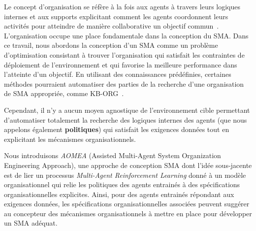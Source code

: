 Le concept d'organisation se réfère à la fois aux agents à travers leurs logiques internes et aux supports explicitant comment les agents coordonnent leurs activités pour atteindre de manière collaborative un objectif commun~\cite{Picard2009reorganisation}. L'organisation occupe une place fondamentale dans la conception du SMA.
%
%
%
%
%
Dans ce travail, nous abordons la conception d'un SMA comme un problème d'optimisation consistant à trouver l'organisation qui satisfait les contraintes de déploiement de l'environnement et qui favorise la meilleure performance dans l'atteinte d'un objectif.
En utilisant des connaissances prédéfinies, certaines méthodes pourraient automatiser des parties de la recherche d'une organisation de SMA appropriée, comme KB-ORG~\cite{Sims2008}.

Cependant, il n'y a aucun moyen agnostique de l'environnement cible permettant d'automatiser totalement la recherche des logiques internes des agents (que nous appelons également \textbf{politiques}) qui satisfait les exigences données tout en explicitant les mécanismes organisationnels. %

Nous introduisons \emph{AOMEA} (Assisted Multi-Agent System Organization Engineering Approach), une approche de conception SMA dont l'idée sous-jacente est de lier un processus \emph{Multi-Agent Reinforcement Learning} donné à un modèle organisationnel qui relie les politiques des agents entrainés à des spécifications organisationnelles explicites. Ainsi, pour des agents entrainés répondant aux exigences données, les spécifications organisationnelles associées peuvent suggérer au concepteur des mécanismes organisationnels à mettre en place pour développer un SMA adéquat.%

